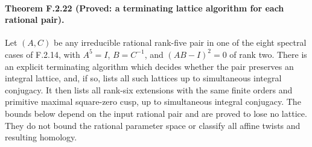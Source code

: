 \paragraph{Theorem F.2.22 (Proved: a terminating lattice algorithm for each rational pair).}
Let $(A,C)$ be any irreducible rational rank-five pair in
one of the eight spectral cases of F.2.14, with
$A^5=I$, $B=C^{-1}$, and $(AB-I)^2=0$ of rank two.
There is an explicit terminating algorithm which decides
whether the pair preserves an integral lattice, and, if so,
lists all such lattices up to simultaneous integral conjugacy.
It then lists all rank-six extensions with the same finite
orders and primitive maximal square-zero cusp, up to
simultaneous integral conjugacy.  The bounds below depend
on the input rational pair and are proved to lose no lattice.
They do not bound the rational parameter space or classify
all affine twists and resulting homology.


